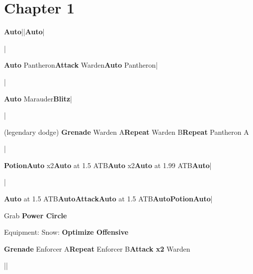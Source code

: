 \section{Chapter 1}

\begin{mainlist}
	\item {}
	\item {} \textbf{Auto}|\skip|\textbf{Auto}|\skip
	\item \skip|\skip
	\item {} \textbf{Auto} Pantheron\to\textbf{Attack} Warden\to\textbf{Auto} Pantheron|\skip
	\item \skip|\skip
	\item {} \textbf{Auto} Marauder\to\textbf{Blitz}|
	\item \skip|\skip
	\item {} (legendary dodge) \textbf{Grenade} Warden A\to\textbf{Repeat} Warden B\to\textbf{Repeat} Pantheron A
	\item \skip|\skip
	\item {} \textbf{Potion}\to\textbf{Auto} x2\to\textbf{Auto} at 1.5 ATB\to\textbf{Auto} x2\to\textbf{Auto} at 1.99 ATB\to\textbf{Auto}|\skip
	\item \save|\skip
	\item {} \textbf{Auto} at 1.5 ATB\to\textbf{Auto}\to\textbf{Attack}\to\textbf{Auto} at 1.5 ATB\to\textbf{Auto}\to\textbf{Potion}\to\textbf{Auto}|
	\item Grab \textbf{Power Circle}
\end{mainlist}

\begin{menu}
	\item Equipment: Snow: \textbf{Optimize Offensive}
\end{menu}

\begin{mainlist}
	\item \skip
	\item {} \textbf{Grenade} Enforcer A\to\textbf{Repeat} Enforcer B\to\textbf{Attack x2} Warden
	\item {}|\skip|\save
\end{mainlist}
